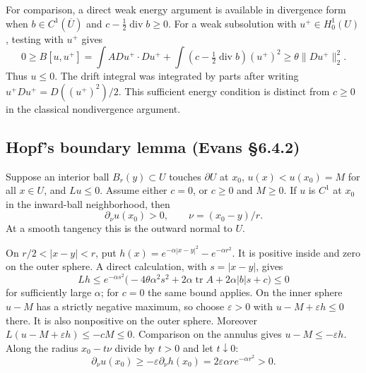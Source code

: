\Needspace{45mm}
For comparison, a direct weak energy argument is available in divergence
form when $b\in C^1(\overline U)$ and
$c-\tfrac12\operatorname{div}b\geq0$.
For a weak subsolution with $u^+\in H^1_0(U)$, testing with $u^+$ gives
\[
 0\geq B[u,u^+]
 =\int A Du^+\cdot Du^+
  +\int(c-\tfrac12\operatorname{div}b)(u^+)^2
 \geq\theta\|Du^+\|_2^2.
\]
Thus $u\leq0$. The drift integral was integrated by parts after writing
$u^+Du^+=D((u^+)^2)/2$.
This sufficient energy condition is distinct from $c\geq0$ in the
classical nondivergence argument.

\Needspace{35mm}
\subsection{Hopf's boundary lemma (Evans \S6.4.2)}
\begin{lemma}\label{lem:6-hopf}
Suppose an interior ball $B_r(y)\subset U$ touches $\partial U$ at $x_0$,
$u(x)<u(x_0)=M$ for all $x\in U$, and $Lu\leq0$.
Assume either $c=0$, or $c\geq0$ and $M\geq0$.
If $u$ is $C^1$ at $x_0$ in the inward-ball neighborhood, then
\[
 \partial_\nu u(x_0)>0,\qquad \nu=(x_0-y)/r.
\]
At a smooth tangency this is the outward normal to $U$.
\end{lemma}
\begin{expandedproof}
On $r/2<|x-y|<r$, put
$h(x)=e^{-\alpha|x-y|^2}-e^{-\alpha r^2}$.
It is positive inside and zero on the outer sphere. A direct calculation,
with $s=|x-y|$, gives
\[
 Lh\leq e^{-\alpha s^2}
 \bigl(-4\theta\alpha^2s^2+
       2\alpha\operatorname{tr}A+2\alpha|b|s+c\bigr)\leq0
\]
for sufficiently large $\alpha$; for $c=0$ the same bound applies.
On the inner sphere $u-M$ has a strictly negative maximum, so choose
$\varepsilon>0$ with $u-M+\varepsilon h\leq0$ there.
It is also nonpositive on the outer sphere.
Moreover $L(u-M+\varepsilon h)\leq-cM\leq0$.
Comparison on the annulus gives $u-M\leq-\varepsilon h$.
Along the radius $x_0-t\nu$ divide by $t>0$ and let $t\downarrow0$:
\[
 \partial_\nu u(x_0)\geq-\varepsilon\partial_\nu h(x_0)
 =2\varepsilon\alpha r e^{-\alpha r^2}>0.
\]
\end{expandedproof}
\Needspace{45mm}

\Needspace{35mm}
